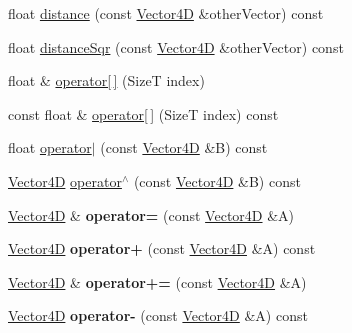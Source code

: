 \begin{DoxyCompactItemize}
float \hyperlink{classdrider_s_d_k_1_1_vector4_d_a3aa1ea1f8fd24f6a1bc5475158c4ded7}{distance} (const \hyperlink{classdrider_s_d_k_1_1_vector4_d}{Vector4D} \&other\+Vector) const
\item 
float \hyperlink{classdrider_s_d_k_1_1_vector4_d_ae470e090d587784df55ed6dce94f57fc}{distance\+Sqr} (const \hyperlink{classdrider_s_d_k_1_1_vector4_d}{Vector4D} \&other\+Vector) const
\item 
float \& \hyperlink{classdrider_s_d_k_1_1_vector4_d_a22777557bf66b8adeb50f24f2943fc66}{operator\mbox{[}$\,$\mbox{]}} (SizeT index)
\item 
const float \& \hyperlink{classdrider_s_d_k_1_1_vector4_d_a6da3ce7013d8b4fef78986433af25971}{operator\mbox{[}$\,$\mbox{]}} (SizeT index) const
\item 
float \hyperlink{classdrider_s_d_k_1_1_vector4_d_a40c293b7041c65fd20f8741b4c3c312d}{operator$\vert$} (const \hyperlink{classdrider_s_d_k_1_1_vector4_d}{Vector4D} \&B) const
\item 
\hyperlink{classdrider_s_d_k_1_1_vector4_d}{Vector4D} \hyperlink{classdrider_s_d_k_1_1_vector4_d_ae6ce7f847b9c2aaa07ba0e992d189587}{operator$^\wedge$} (const \hyperlink{classdrider_s_d_k_1_1_vector4_d}{Vector4D} \&B) const
\item 
\mbox{\label{classdrider_s_d_k_1_1_vector4_d_a98eb14acc45ecbb0214fdaa25923aa9e}} 
\hyperlink{classdrider_s_d_k_1_1_vector4_d}{Vector4D} \& {\bfseries operator=} (const \hyperlink{classdrider_s_d_k_1_1_vector4_d}{Vector4D} \&A)
\item 
\mbox{\label{classdrider_s_d_k_1_1_vector4_d_a2c7fbcc833cfa0fb776a9231434293d0}} 
\hyperlink{classdrider_s_d_k_1_1_vector4_d}{Vector4D} {\bfseries operator+} (const \hyperlink{classdrider_s_d_k_1_1_vector4_d}{Vector4D} \&A) const
\item 
\mbox{\label{classdrider_s_d_k_1_1_vector4_d_afb27b2c43a38df5767f1e0a9d2b77fc7}} 
\hyperlink{classdrider_s_d_k_1_1_vector4_d}{Vector4D} \& {\bfseries operator+=} (const \hyperlink{classdrider_s_d_k_1_1_vector4_d}{Vector4D} \&A)
\item 
\mbox{\label{classdrider_s_d_k_1_1_vector4_d_a1f3b703db359083ab5061689b4721b9f}} 
\hyperlink{classdrider_s_d_k_1_1_vector4_d}{Vector4D} {\bfseries operator-\/} (const \hyperlink{classdrider_s_d_k_1_1_vector4_d}{Vector4D} \&A) const

\end{DoxyCompactItemize}
